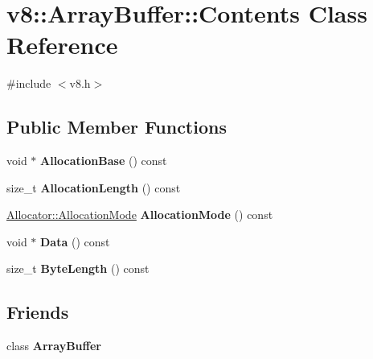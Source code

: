\hypertarget{classv8_1_1ArrayBuffer_1_1Contents}{}\section{v8\+:\+:Array\+Buffer\+:\+:Contents Class Reference}
\label{classv8_1_1ArrayBuffer_1_1Contents}


{\ttfamily \#include $<$v8.\+h$>$}

\subsection*{Public Member Functions}
\begin{DoxyCompactItemize}
\item 
\mbox{\label{classv8_1_1ArrayBuffer_1_1Contents_a6982d157697f42fde9007989c0150d89}} 
void $\ast$ {\bfseries Allocation\+Base} () const
\item 
\mbox{\label{classv8_1_1ArrayBuffer_1_1Contents_abf5ffac83be8c88a602cce7b852f4a62}} 
size\+\_\+t {\bfseries Allocation\+Length} () const
\item 
\mbox{\label{classv8_1_1ArrayBuffer_1_1Contents_a82b2bbacac1a218439f80063af457287}} 
\mbox{\hyperlink{classv8_1_1ArrayBuffer_1_1Allocator_ab106d1fbad7be9f6fd8b0f5c550ac59e}{Allocator\+::\+Allocation\+Mode}} {\bfseries Allocation\+Mode} () const
\item 
\mbox{\label{classv8_1_1ArrayBuffer_1_1Contents_a4eaa3609be49d6fd2055971242c5a6e0}} 
void $\ast$ {\bfseries Data} () const
\item 
\mbox{\label{classv8_1_1ArrayBuffer_1_1Contents_ac4ca77bb59e6cbb004d9edaa79d30ad6}} 
size\+\_\+t {\bfseries Byte\+Length} () const
\end{DoxyCompactItemize}
\subsection*{Friends}
\begin{DoxyCompactItemize}
\item 
\mbox{\label{classv8_1_1ArrayBuffer_1_1Contents_acbcb25033a90500a51aa19c811b2a1d3}} 
class {\bfseries Array\+Buffer}
\end{DoxyCompactItemize}


